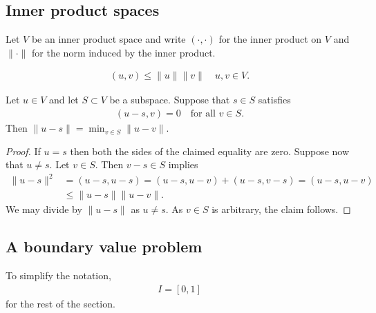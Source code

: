 \documentclass[12pt,oneside]{amsart}
\begin{document}
\subsection{Inner product spaces}

Let $V$ be an inner product space and write $(\cdot, \cdot)$ for the inner product on $V$ and $\|\cdot\|$ for the norm induced by the inner product.

\begin{lemma}
    \begin{align*}
(u, v) \le \|u\| \|v\| \quad u,v \in V.
    \end{align*}
\end{lemma}

\begin{lemma}
Let $u \in V$ and let $S \subset V$ be a subspace. Suppose that $s \in S$ satisfies
    \begin{align*}
(u - s, v) = 0 \quad \text{for all $v \in S$}.
    \end{align*}
Then $\| u - s \| = \min_{v \in S} \| u - v \|$.
\end{lemma}
\begin{proof}
If $u = s$ then both the sides of the claimed equality are zero.
Suppose now that $u \ne s$. Let $v \in S$. Then $v -s \in S$ implies
    \begin{align*}
\| u - s \|^2 
&= 
(u - s, u - s) 
= 
(u - s, u - v) + (u - s, v - s)
= 
(u - s, u - v) 
\\&\le 
\| u - s \| \| u - v \|.
    \end{align*}
We may divide by $\| u - s \|$ as $u \ne s$. As $v \in S$ is arbitrary, the claim follows.
\end{proof}

\subsection{A boundary value problem}

To simplify the notation, 
    \begin{align*}
I = [0,1]
    \end{align*}
for the rest of the section.
\end{document}

